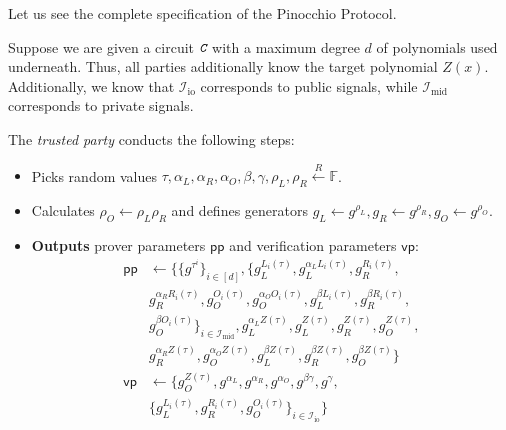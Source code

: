 \documentclass[../lecture-notes.tex]{subfiles}
\begin{document}
Let us see the complete specification of the Pinocchio Protocol.

\begin{tcolorbox}[breakable, title=Pinocchio Protocol,
    colback=blue!5!white,
    colframe=blue!75!black,
    colbacktitle=blue!25!white,
    coltitle=blue!20!black,
    fonttitle=\bfseries,
    boxrule=1.25pt,
    subtitle style={boxrule=0pt,
    colback=blue!20!white,
    colupper=blue!75!gray} ]
    \small
    Suppose we are given a circuit $\textit{\texttt{C}}$ with a maximum degree $d$ of polynomials used underneath. Thus, all parties additionally know the target polynomial $Z(x)$. Additionally, we know that $\mathcal{I}_{\text{io}}$ corresponds to public signals, while $\mathcal{I}_{\text{mid}}$ corresponds to private signals.

    The \emph{trusted party} conducts the following steps:
    \begin{itemize}[label=]
        \item Picks random values $\tau, \alpha_L, \alpha_R, \alpha_O, \beta, \gamma, \rho_L, \rho_R \xleftarrow{R} \mathbb{F}$.
        \item Calculates $\rho_O \gets \rho_L\rho_R$ and defines generators $g_L \gets g^{\rho_L}, g_R \gets g^{\rho_R}, g_O \gets g^{\rho_O}$.
        \item \textbf{Outputs} prover parameters $\mathsf{pp}$ and verification parameters $\mathsf{vp}$:
        \begin{equation*}
            \begin{aligned}                
                \mathsf{pp} &\gets \big\{\{g^{\tau^i}\}_{i \in [d]}, \{g_L^{L_i(\tau)}, g_L^{\alpha_LL_i(\tau)}, g_R^{R_i(\tau)}, \\
                            & g_R^{\alpha_RR_i(\tau)}, g_O^{O_i(\tau)}, g_O^{\alpha_O O_i(\tau)}, g_L^{\beta L_i(\tau)}, g_R^{\beta R_i(\tau)}, \\ 
                            & g_O^{\beta O_i(\tau)}\}_{i \in \mathcal{I}_{\text{mid}}}, g_L^{\alpha_L Z(\tau)}, g_L^{Z(\tau)}, g_R^{Z(\tau)}, g_O^{Z(\tau)}, \\ 
                            & g_R^{\alpha_R Z(\tau)}, g_O^{\alpha_O Z(\tau)}, g_L^{\beta Z(\tau)}, g_R^{\beta Z(\tau)}, g_O^{\beta Z(\tau)}\big\} \\
                \mathsf{vp} &\gets \big\{ g_O^{Z(\tau)}, g^{\alpha_L}, g^{\alpha_R}, g^{\alpha_O}, g^{\beta\gamma}, g^{\gamma}, \\
                            & \{g_L^{L_i(\tau)}, g_R^{R_i(\tau)}, g_O^{O_i(\tau)}\}_{i \in \mathcal{I}_{\text{io}}} \big\}

\end{aligned}
\end{equation*}
\end{itemize}
\end{tcolorbox}
\end{document}
